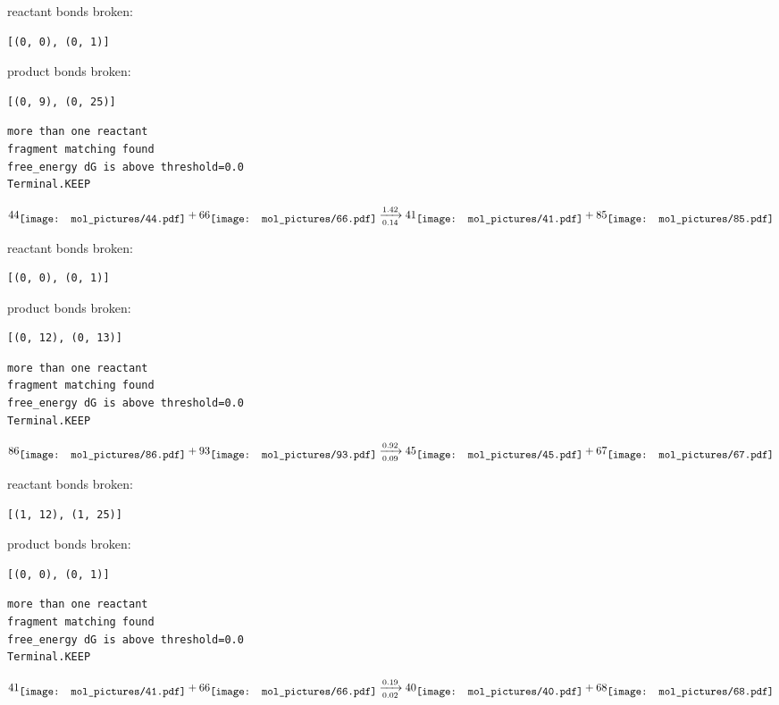 \documentclass{article}
\begin{document}
reactant bonds broken:\begin{verbatim}
[(0, 0), (0, 1)]
\end{verbatim}
product bonds broken:\begin{verbatim}
[(0, 9), (0, 25)]
\end{verbatim}




\vspace{1cm}
\begin{verbatim}
more than one reactant
fragment matching found
free_energy dG is above threshold=0.0
Terminal.KEEP
\end{verbatim}
$$
44
\raisebox{-.5\height}{\texttt{[image: mol\_pictures/44.pdf]}}
+
66
\raisebox{-.5\height}{\texttt{[image: mol\_pictures/66.pdf]}}
\xrightarrow[0.14]{1.42}
41
\raisebox{-.5\height}{\texttt{[image: mol\_pictures/41.pdf]}}
+
85
\raisebox{-.5\height}{\texttt{[image: mol\_pictures/85.pdf]}}
$$


reactant bonds broken:\begin{verbatim}
[(0, 0), (0, 1)]
\end{verbatim}
product bonds broken:\begin{verbatim}
[(0, 12), (0, 13)]
\end{verbatim}




\vspace{1cm}
\begin{verbatim}
more than one reactant
fragment matching found
free_energy dG is above threshold=0.0
Terminal.KEEP
\end{verbatim}
$$
86
\raisebox{-.5\height}{\texttt{[image: mol\_pictures/86.pdf]}}
+
93
\raisebox{-.5\height}{\texttt{[image: mol\_pictures/93.pdf]}}
\xrightarrow[0.09]{0.92}
45
\raisebox{-.5\height}{\texttt{[image: mol\_pictures/45.pdf]}}
+
67
\raisebox{-.5\height}{\texttt{[image: mol\_pictures/67.pdf]}}
$$


reactant bonds broken:\begin{verbatim}
[(1, 12), (1, 25)]
\end{verbatim}
product bonds broken:\begin{verbatim}
[(0, 0), (0, 1)]
\end{verbatim}




\vspace{1cm}
\begin{verbatim}
more than one reactant
fragment matching found
free_energy dG is above threshold=0.0
Terminal.KEEP
\end{verbatim}
$$
41
\raisebox{-.5\height}{\texttt{[image: mol\_pictures/41.pdf]}}
+
66
\raisebox{-.5\height}{\texttt{[image: mol\_pictures/66.pdf]}}
\xrightarrow[0.02]{0.19}
40
\raisebox{-.5\height}{\texttt{[image: mol\_pictures/40.pdf]}}
+
68
\raisebox{-.5\height}{\texttt{[image: mol\_pictures/68.pdf]}}
$$
\end{document}
